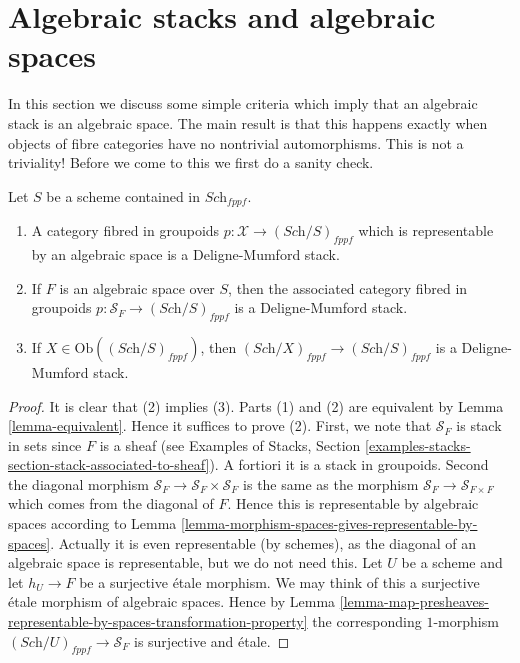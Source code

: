 \section{Algebraic stacks and algebraic spaces}
\label{section-stacks-spaces}

\noindent
In this section we discuss some simple criteria which imply that an
algebraic stack is an algebraic space. The main result is that this
happens exactly when objects of fibre categories have no nontrivial
automorphisms. This is not a triviality! Before we come to this
we first do a sanity check.

\begin{lemma}
\label{lemma-representable-algebraic}
Let $S$ be a scheme contained in $\textit{Sch}_{fppf}$.
\begin{enumerate}
\item A category fibred in groupoids
$p : \mathcal{X} \to (\textit{Sch}/S)_{fppf}$
which is representable by an algebraic space is a Deligne-Mumford stack.
\item If $F$ is an algebraic space over $S$, then the associated
category fibred in groupoids
$p : \mathcal{S}_F \to (\textit{Sch}/S)_{fppf}$
is a Deligne-Mumford stack.
\item If $X \in \text{Ob}((\textit{Sch}/S)_{fppf})$, then
$(\textit{Sch}/X)_{fppf} \to (\textit{Sch}/S)_{fppf}$ is
a Deligne-Mumford stack.
\end{enumerate}
\end{lemma}

\begin{proof}
It is clear that (2) implies (3).
Parts (1) and (2) are equivalent by Lemma \ref{lemma-equivalent}.
Hence it suffices to prove (2).
First, we note that $\mathcal{S}_F$ is stack in sets since
$F$ is a sheaf (see
Examples of Stacks,
Section \ref{examples-stacks-section-stack-associated-to-sheaf}).
A fortiori it is a stack in groupoids. Second the diagonal
morphism $\mathcal{S}_F \to \mathcal{S}_F  \times \mathcal{S}_F$
is the same as the morphism $\mathcal{S}_F \to \mathcal{S}_{F \times F}$
which comes from the diagonal of $F$. Hence this is representable
by algebraic spaces according to
Lemma \ref{lemma-morphism-spaces-gives-representable-by-spaces}.
Actually it is even representable (by schemes), as the diagonal of
an algebraic space is representable, but we do not need this.
Let $U$ be a scheme and let $h_U \to F$ be a surjective \'etale morphism.
We may think of this a surjective \'etale morphism of algebraic spaces.
Hence by
Lemma
\ref{lemma-map-presheaves-representable-by-spaces-transformation-property}
the corresponding $1$-morphism $(\textit{Sch}/U)_{fppf} \to \mathcal{S}_F$
is surjective and \'etale.
\end{proof}

